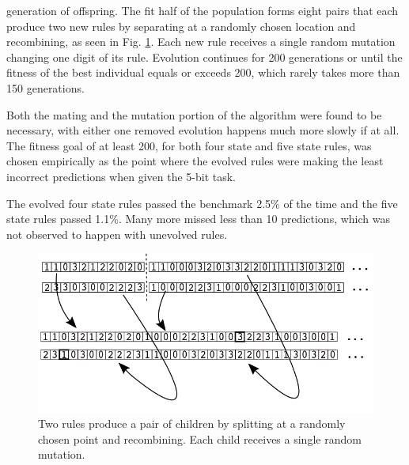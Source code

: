 \documentclass{elsarticle}
\begin{document}
\begin{multicols}{2}
           generation of offspring.  The fit half of the population forms eight 
           pairs that each produce two new rules by separating at a randomly 
           chosen location and recombining, as seen in Fig. \ref{GA}. Each new 
           rule receives a single random mutation changing one digit of its 
           rule.  Evolution continues for 200 generations or until the fitness 
           of the best individual equals or exceeds 200, which rarely takes 
           more than 150 generations.  \par Both the mating and the mutation 
           portion of the algorithm were found to be necessary, with either one 
           removed evolution happens much more slowly if at all. The fitness 
           goal of at least 200, for both four state and five state rules, was 
           chosen empirically as the point where the evolved rules were making 
           the least incorrect predictions when given the 5-bit task. \par
     The evolved four state rules passed the benchmark 2.5\% of the time and 
     the five state rules passed 1.1\%. Many more missed less than 10 
     predictions, which was not observed to happen with unevolved rules.




\begin{figure}[H]
  \centering
    \includegraphics[width=\linewidth]{GA.png}
  \caption{Two rules produce a pair of children by splitting at a randomly 
      chosen point and recombining. Each child receives a single random 
          mutation.}
  \label{GA}
  \end{figure}


\end{multicols}
\end{document}
